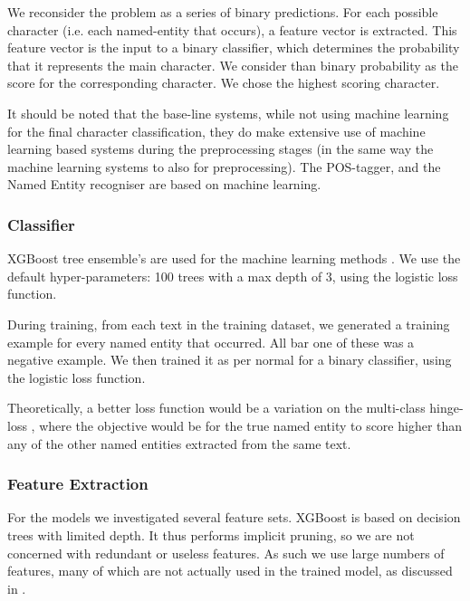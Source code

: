 \documentclass[11pt,a4paper]{article}
\newcommand{\parencite}{\citep}
\begin{document}
We reconsider the problem as a series of binary predictions.
For each possible character (i.e. each named-entity that occurs), a feature vector is extracted.
This feature vector is the input to a binary classifier, which determines the probability that it represents the main character.
We consider than binary probability as the score for the corresponding character.
We chose the highest scoring character.

It should be noted that the base-line systems, while not using machine learning for the final character classification, they do make extensive use of machine learning based systems during the preprocessing stages (in the same way the machine learning systems to also for preprocessing).
The POS-tagger, and the Named Entity recogniser are based on machine learning.

\subsubsection{Classifier}
XGBoost tree ensemble's are used for the machine learning methods \parencite{chen2016xgboost}.
We use the default hyper-parameters:  100 trees with a max depth of 3,
using the logistic loss function.

During training, from each text in the training dataset,
we generated a training example for every named entity that occurred.
All bar one of these was a negative example.
We then trained it as per normal for a binary classifier, using the logistic loss function.

Theoretically, a better loss function would be a variation on the multi-class hinge-loss \parencite{dogan2016multiclassSVM}, where the objective would be for the true named entity to score higher than any of the other named entities extracted from the same text.



\subsubsection{Feature Extraction}
For the models we investigated several feature sets.
XGBoost is based on decision trees with limited depth.
It thus performs implicit pruning, so we are not concerned with redundant or useless features.
As such we use large numbers of features, many of which are not actually used in the trained model, as discussed in .
\end{document}
